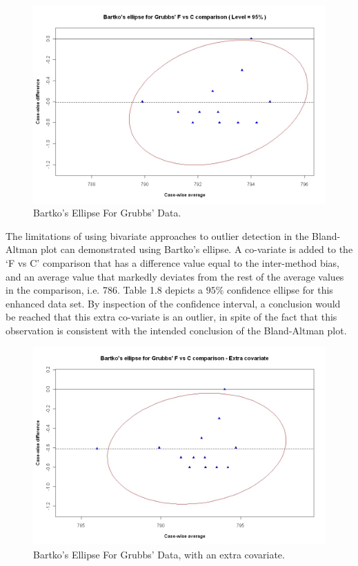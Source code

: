 \documentclass[12pt, a4paper]{report}
\begin{document}
	
	\begin{figure}[h!]
		\includegraphics[width=130mm]{images/GrubbsBartko.jpeg}
		\caption{Bartko's Ellipse For Grubbs' Data.}\label{GrubbsBartko}
	\end{figure}
	
	The limitations of using bivariate approaches to outlier detection
	in the Bland-Altman plot can demonstrated using Bartko's ellipse.
	A co-variate is added to the `F vs C' comparison that has a	difference value equal to the inter-method bias, and an average	value that markedly deviates from the rest of the average values in the comparison, i.e. 786. Table 1.8 depicts a $95\%$ confidence
	ellipse for this enhanced data set. By inspection of the confidence interval, a conclusion would be reached that this extra
	co-variate is an outlier, in spite of the fact that this observation is consistent with the intended conclusion of the
	Bland-Altman plot.
	
	\begin{figure}[h!]
		\includegraphics[width=130mm]{images/GrubbsBartko2.jpeg}
		\caption{Bartko's Ellipse For Grubbs' Data, with an extra covariate.}\label{GrubbsBartko2}
	\end{figure}
	
\end{document}
